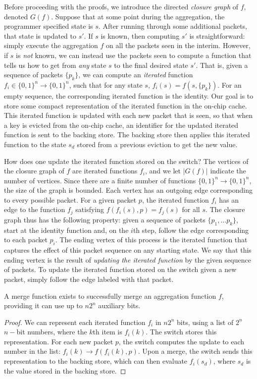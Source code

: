 Before proceeding with the proofs, we introduce the directed \emph{closure graph} of $f$, denoted $G(f)$. Suppose that at some point during the aggregation, 
the programmer specified state is $s$. After running through some additional packets, that state is updated to $s'$. If $s$ is known, then computing
$s'$ is straightforward: simply execute the aggregation $f$ on all the packets seen in the interim. However, if $s$ is \emph{not} known, we can instead
use the packets seen to compute a function that tells us how to get from \emph{any} state $s$ to the final desired state $s'$. That is, given a sequence of packets $\{p_k\}$,
we can compute an \emph{iterated} function $f_i \in \{0,1\}^n \rightarrow \{0,1\}^n$, such that for any state $s$, $f_i(s) = f(s, \{p_k\})$. For an empty sequence, the corresponding iterated function is the identity.
Our goal is to store some compact representation of the iterated function in the on-chip cache. This iterated function is updated with each new packet that is seen, so that when a key is evicted from the on-chip cache,
an identifier for the updated iterated function is sent to the backing store. The backing store then applies this iterated function to the state $s_d$ stored from a previous eviction to get the new value.

How does one update the iterated function stored on the switch? The vertices of the closure graph of $f$ are iterated functions $f_i$, and we let $|G(f)|$ indicate the number of vertices. Since there are a finite number of functions $\{0, 1\}^n \rightarrow \{0, 1\}^n$, the size of the graph is bounded.
Each vertex has an outgoing edge corresponding to every possible packet. For a given packet $p$, the iterated function $f_i$ has an edge to the function $f_j$ satisfying $f(f_i(s), p) = f_j(s)$ for all $s$.
The closure graph thus has the following property: given a sequence of packets $\{p_1, \ldots p_k\}$, start at the identity function and, on the $i$th step, follow the edge corresponding to each packet $p_i$. The ending vertex of this process is the iterated function that captures the effect of this packet sequence on any starting state. We say that this ending vertex is the result of \emph{updating the iterated function} by the given sequence of packets. To update the iterated function stored on the switch given a new packet, simply follow the edge labeled with that packet.

\begin{theorem}
A merge function exists to successfully merge an aggregation function $f$, providing it can use up to $n2^n$ auxiliary bits.
\end{theorem}
\begin{proof}
We can represent each iterated function $f_i$ in $n2^n$ bits, using a list of $2^n$ $n-$bit numbers, where the $k$th item is $f_i(k)$. The switch stores this representation. For each new packet $p$, the switch computes the update to each number in the list: $f_i(k) \rightarrow f(f_i(k), p)$. Upon a merge, the switch sends this representation to the backing store, which can then evaluate $f_i(s_d)$, where $s_d$ is the value stored in the backing store.
\end{proof}

